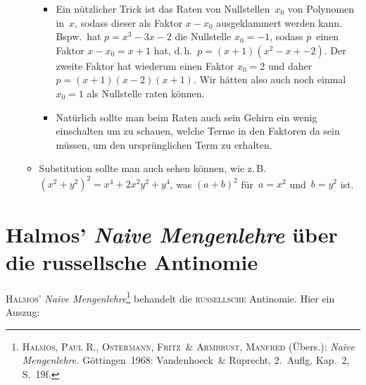 \documentclass[a4paper]{article}
\begin{document}
\begin{itemize}
\begin{itemize}
\begin{itemize}
                        \item Ein nützlicher Trick ist das Raten von Nullstellen~$x_0$ von Polynomen in~$x$, sodass dieser als Faktor $x - x_0$ ausgeklammert werden kann. Bspw.\ hat $p = x^3 - 3x - 2$ die Nullstelle $x_0 = -1$, sodass $p$~einen Faktor $x-x_0 = x+1$ hat, d.\,h.\ $p = (x+1) (x^2 - x + -2)$. Der zweite Faktor hat wiederum einen Faktor $x_0 = 2$ und daher $p = (x+1) (x-2) (x+1)$. Wir hätten also auch noch einmal $x_0 = 1$ als Nullstelle raten können.
                        \item Natürlich sollte man beim Raten auch sein Gehirn ein wenig einschalten um zu schauen, welche Terme in den Faktoren da sein müssen, um den ursprünglichen Term zu erhalten.
                    \end{itemize}
              \item Substitution sollte man auch sehen können, wie z.\,B.\ $(x^2 + y^2)^2 = x^4 + 2x^2y^2 + y^4$, was $(a + b)^2$ für~$a = x^2$ und~$b = y^2$ ist.
          \end{itemize}
\end{itemize}

\section{Halmos' \emph{Naive Mengenlehre} über die russellsche Antinomie}\label{apx:russell}

\textsc{Halmos'} \emph{Naive Mengenlehre}\footnote{\textsc{Halmos, Paul R.}, \textsc{Ostermann, Fritz}~\& \textsc{Armbrust, Manfred} (Übers.): \textit{Naive Mengenlehre.} Göttingen~1968: Vandenhoeck~\& Ruprecht, 2.~Auflg. Kap.~2, S.~19f.} behandelt die \textsc{russellsche} Antinomie. Hier ein Auszug:
\end{document}
